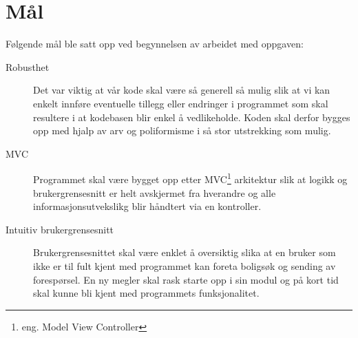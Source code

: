 \section{Mål}
Følgende mål ble satt opp ved begynnelsen av arbeidet med oppgaven:
\begin{description}
\item[Robusthet]
Det var viktig at vår kode skal være så generell så mulig slik at vi kan enkelt innføre eventuelle tillegg eller endringer i programmet som skal resultere i at kodebasen blir enkel å vedlikeholde. Koden skal derfor bygges opp med hjalp av arv og poliformisme i så stor utstrekking som mulig.
\item[MVC]
Programmet skal være bygget opp etter MVC\footnote{eng. Model View Controller} arkitektur slik at logikk og brukergrensesnitt er helt avskjermet fra hverandre og alle informasjonsutvekslikg blir håndtert via en kontroller. 
\item[Intuitiv brukergrensesnitt]
Brukergrensesnittet skal være enklet å oversiktig slika at en bruker som ikke er til fult kjent med programmet kan foreta boligsøk og sending av forespørsel. En ny megler skal rask starte opp i sin modul og på kort tid skal kunne bli kjent med programmets funksjonalitet.
\end{description}
